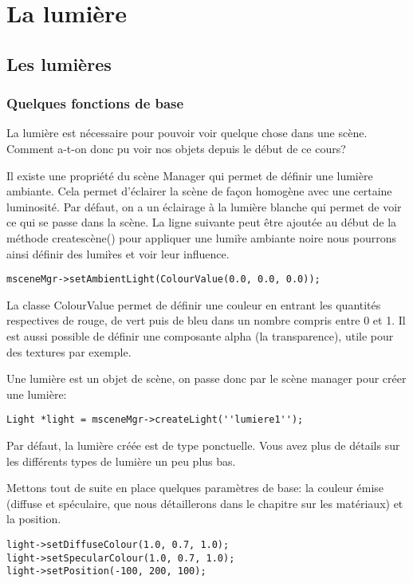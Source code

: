 \chapter{La lumi\`ere}



\section{Les lumi\`eres}


\subsection{Quelques fonctions de base}

La lumi\`ere est n\'ecessaire pour pouvoir voir quelque chose dans une sc\`ene. Comment a-t-on donc pu voir nos objets depuis le d\'ebut de ce cours?

Il existe une propri\'et\'e du sc\`ene Manager qui permet de d\'efinir une lumi\`ere ambiante. Cela permet d'\'eclairer la sc\`ene de fa\c{c}on homog\`ene avec une certaine luminosit\'e. Par d\'efaut, on a un \'eclairage \`{a} la lumi\`ere blanche qui permet de voir ce qui se passe dans la sc\`ene. La ligne suivante peut \^etre ajout\'ee au d\'ebut de la m\'ethode createsc\`ene() pour appliquer une lumi\`re ambiante noire nous pourrons ainsi d\'efinir des lumi\`res et voir leur influence.

\begin{lstlisting}
msceneMgr->setAmbientLight(ColourValue(0.0, 0.0, 0.0));
\end{lstlisting}



La classe ColourValue permet de d\'efinir une couleur en entrant les quantit\'es respectives de rouge, de vert puis de bleu dans un nombre compris entre 0 et 1. Il est aussi possible de d\'efinir une composante alpha (la transparence), utile pour des textures par exemple.

Une lumi\`ere est un objet de sc\`ene, on passe donc par le sc\`ene manager pour cr\'eer une lumi\`ere:
\begin{lstlisting}
Light *light = msceneMgr->createLight(''lumiere1'');
\end{lstlisting}

Par d\'efaut, la lumi\`ere cr\'e\'ee est de type ponctuelle. Vous avez plus de d\'etails sur les diff\'erents types de lumi\`ere un peu plus bas.

Mettons tout de suite en place quelques param\`etres de base: la couleur \'emise (diffuse et sp\'eculaire, que nous d\'etaillerons dans le chapitre sur les mat\'eriaux) et la position.
\begin{lstlisting}
light->setDiffuseColour(1.0, 0.7, 1.0);
light->setSpecularColour(1.0, 0.7, 1.0);
light->setPosition(-100, 200, 100);
\end{lstlisting}




